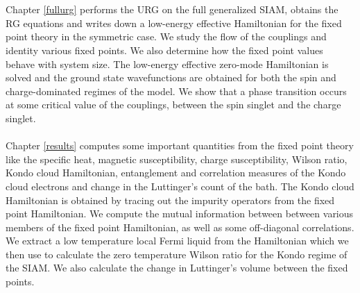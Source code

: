 \documentclass[twoside,11pt]{report}
\numberwithin{equation}{section}
\begin{document}
\\\\ Chapter \ref{fullurg} performs the URG on the full generalized SIAM, obtains the RG equations and writes down a low-energy effective Hamiltonian for the fixed point theory in the symmetric case. We study the flow of the couplings and identity various fixed points. We also determine how the fixed point values behave with system size. The low-energy effective zero-mode Hamiltonian is solved and the ground state wavefunctions are obtained for both the spin and charge-dominated regimes of the model. We show that a phase transition occurs at some critical value of the couplings, between the spin singlet and the charge singlet.
\\\\ Chapter \ref{results} computes some important quantities from the fixed point theory like the specific heat, magnetic susceptibility, charge susceptibility, Wilson ratio, Kondo cloud Hamiltonian, entanglement and correlation measures of the Kondo cloud electrons and change in the Luttinger's count of the bath.  The Kondo cloud Hamiltonian is obtained by tracing out the impurity operators from the fixed point Hamiltonian. We compute the mutual information between between various members of the fixed point Hamiltonian, as well as some off-diagonal correlations. We extract a low temperature local Fermi liquid from the Hamiltonian which we then use to calculate the zero temperature Wilson ratio for the Kondo regime of the SIAM. We also calculate the change in Luttinger's volume between the fixed points.
\end{document}
